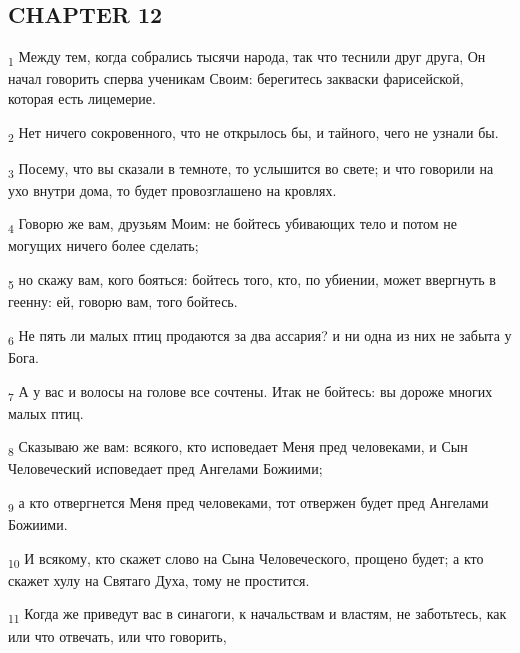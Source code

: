 \subsection{CHAPTER 12}
\begin{tcolorbox}
\textsubscript{1} Между тем, когда собрались тысячи народа, так что теснили друг друга, Он начал говорить сперва ученикам Своим: берегитесь закваски фарисейской, которая есть лицемерие.
\end{tcolorbox}
\begin{tcolorbox}
\textsubscript{2} Нет ничего сокровенного, что не открылось бы, и тайного, чего не узнали бы.
\end{tcolorbox}
\begin{tcolorbox}
\textsubscript{3} Посему, что вы сказали в темноте, то услышится во свете; и что говорили на ухо внутри дома, то будет провозглашено на кровлях.
\end{tcolorbox}
\begin{tcolorbox}
\textsubscript{4} Говорю же вам, друзьям Моим: не бойтесь убивающих тело и потом не могущих ничего более сделать;
\end{tcolorbox}
\begin{tcolorbox}
\textsubscript{5} но скажу вам, кого бояться: бойтесь того, кто, по убиении, может ввергнуть в геенну: ей, говорю вам, того бойтесь.
\end{tcolorbox}
\begin{tcolorbox}
\textsubscript{6} Не пять ли малых птиц продаются за два ассария? и ни одна из них не забыта у Бога.
\end{tcolorbox}
\begin{tcolorbox}
\textsubscript{7} А у вас и волосы на голове все сочтены. Итак не бойтесь: вы дороже многих малых птиц.
\end{tcolorbox}
\begin{tcolorbox}
\textsubscript{8} Сказываю же вам: всякого, кто исповедает Меня пред человеками, и Сын Человеческий исповедает пред Ангелами Божиими;
\end{tcolorbox}
\begin{tcolorbox}
\textsubscript{9} а кто отвергнется Меня пред человеками, тот отвержен будет пред Ангелами Божиими.
\end{tcolorbox}
\begin{tcolorbox}
\textsubscript{10} И всякому, кто скажет слово на Сына Человеческого, прощено будет; а кто скажет хулу на Святаго Духа, тому не простится.
\end{tcolorbox}
\begin{tcolorbox}
\textsubscript{11} Когда же приведут вас в синагоги, к начальствам и властям, не заботьтесь, как или что отвечать, или что говорить,
\end{tcolorbox}
